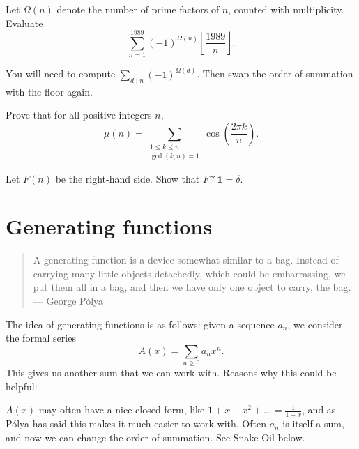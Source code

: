 \documentclass[11pt]{scrartcl}
\begin{document}
\begin{problem}
  [Bulgaria 1989]
  Let $\Omega(n)$ denote the number of prime factors of $n$,
  counted with multiplicity. Evaluate
  \[ \sum_{n=1}^{1989} (-1)^{\Omega(n)}
    \left\lfloor \frac{1989}{n} \right\rfloor.  \]
  \begin{hint}
    You will need to compute $\sum_{d \mid n} (-1)^{\Omega(d)}$.
    Then swap the order of summation with the floor again.
  \end{hint}
\end{problem}

\begin{problem}
  Prove that for all positive integers $n$,
  \[
    \mu(n)
    = \sum_{\substack{1 \le k \le n \\ \gcd(k,n)=1}}
    \cos\left( \frac{2\pi k}{n} \right).
  \]
  \begin{hint}
    Let $F(n)$ be the right-hand side.
    Show that $F \ast \mathbf 1 = \delta$.
  \end{hint}
\end{problem}

\section{Generating functions}
\begin{quote}
  A generating function is a device somewhat similar to a bag. Instead of carrying many little objects detachedly, which could be embarrassing, we put them all in a bag, and then we have only one object to carry, the bag. \\ --- George P\'olya
\end{quote}

The idea of generating functions is as follows:
given a sequence $a_n$, we consider the formal series
\[ A(x) = \sum_{n \ge 0} a_n x^n. \]
This gives us another sum that we can work with.
Reasons why this could be helpful:
\begin{itemize}
  \ii $A(x)$ may often have a nice closed form,
  like $1 + x + x^2 + \dots = \frac{1}{1-x}$,
  and as P\'olya has said this makes it much easier to work with.
  \ii Often $a_n$ is itself a sum,
  and now we can change the order of summation.
  See Snake Oil below.
\end{itemize}
\end{document}
